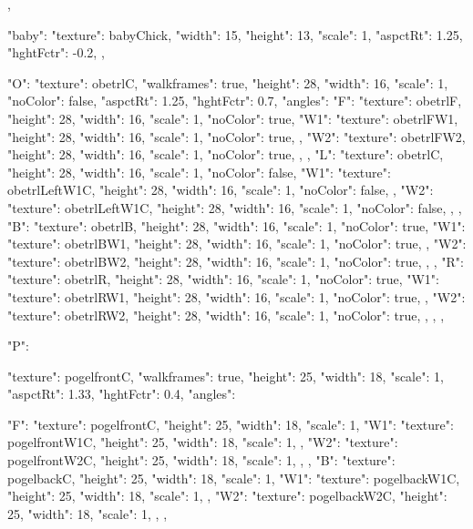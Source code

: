 {{{    }
  },

  "baby": {
    "texture": babyChick,
    "width": 15,
    "height": 13,
    "scale": 1,
    "aspctRt": 1.25,
    "hghtFctr": -0.2,
  },

  "O": {
    "texture": obetrlC,
    "walkframes": true,
    "height": 28,
    "width": 16,
    "scale": 1,
    "noColor": false,
    "aspctRt": 1.25,
    "hghtFctr": 0.7,
    "angles":{
      "F": {
        "texture": obetrlF,
        "height": 28,
        "width": 16,
        "scale": 1,
        "noColor": true,
        "W1": {
          "texture": obetrlFW1,
          "height": 28,
          "width": 16,
          "scale": 1,
          "noColor": true,
        },
        "W2": {
          "texture": obetrlFW2,
          "height": 28,
          "width": 16,
          "scale": 1,
          "noColor": true,
        },
      },
      "L": {
        "texture": obetrlC,
        "height": 28,
        "width": 16,
        "scale": 1,
        "noColor": false,
        "W1": {
          "texture": obetrlLeftW1C,
          "height": 28,
          "width": 16,
          "scale": 1,
          "noColor": false,
        },
        "W2": {
          "texture": obetrlLeftW1C,
          "height": 28,
          "width": 16,
          "scale": 1,
          "noColor": false,
        },
      },
      "B": {
        "texture": obetrlB,
        "height": 28,
        "width": 16,
        "scale": 1,
        "noColor": true,
        "W1": {
          "texture": obetrlBW1,
          "height": 28,
          "width": 16,
          "scale": 1,
          "noColor": true,
        },
        "W2": {
          "texture": obetrlBW2,
          "height": 28,
          "width": 16,
          "scale": 1,
          "noColor": true,
        },
      },
      "R": {
        "texture": obetrlR,
        "height": 28,
        "width": 16,
        "scale": 1,
        "noColor": true,
        "W1": {
          "texture": obetrlRW1,
          "height": 28,
          "width": 16,
          "scale": 1,
          "noColor": true,
        },
        "W2": {
          "texture": obetrlRW2,
          "height": 28,
          "width": 16,
          "scale": 1,
          "noColor": true,
        },
      },
    }
  },

  "P": {
    "texture": pogelfrontC,
    "walkframes": true,
    "height": 25,
    "width": 18,
    "scale": 1,
    "aspctRt": 1.33,
    "hghtFctr": 0.4,
    "angles":{
      "F": {
        "texture": pogelfrontC,
        "height": 25,
        "width": 18,
        "scale": 1,
        "W1": {
          "texture": pogelfrontW1C,
          "height": 25,
          "width": 18,
          "scale": 1,
        },
        "W2": {
          "texture": pogelfrontW2C,
          "height": 25,
          "width": 18,
          "scale": 1,
        },
      },
      "B": {
        "texture": pogelbackC,
        "height": 25,
        "width": 18,
        "scale": 1,
        "W1": {
          "texture": pogelbackW1C,
          "height": 25,
          "width": 18,
          "scale": 1,
        },
        "W2": {
          "texture": pogelbackW2C,
          "height": 25,
          "width": 18,
          "scale": 1,
        },
      },

}}}
